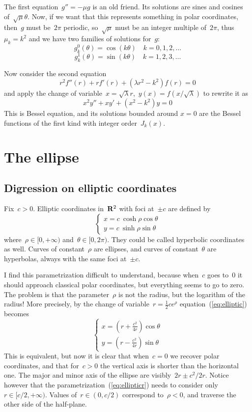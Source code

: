 The first equation~$g''=-\mu g$ is an old friend.  Its solutions are
sines and cosines of~$\sqrt{\mu}\theta$.  Now, if we want that this
represents something in polar coordinates, then~$g$ must be~$2\pi$
periodic, so~$\sqrt{\mu}$ must be an integer multiple of~$2\pi$,
thus~$\mu_k=k^2$ and we have two families of solutions
for~$g$:
\[
	g^0_k(\theta) = \cos(k \theta)
	\quad k=0,1,2,\ldots
\]
\[
	g^1_k(\theta) = \sin(k \theta)
	\quad k=1,2,3,\ldots
\]

Now consider the second equation
\[
	r^2f''(r) + rf'(r)
	+\left(\lambda r^2
		-
	k^2
	\right)f(r) = 0
\]
and apply the change of variable~$x=\sqrt\lambda
r$,~$y(x)=f\left(x/\sqrt\lambda\right)$ to rewrite it as
\[
		x^2y''+xy'+\left(x^2-
	k^2\right)y=0
\]
This is Bessel equation, and its solutions bounded around $x=0$ are
the Bessel functions of the first kind with integer order~$J_k(x)$.

\section{The ellipse}


\subsection{Digression on elliptic coordinates}

Fix~$c>0$.  Elliptic coordinates in~$\mathbf{R}^2$ with foci at~$\pm c$ are
defined by
\begin{equation}\label{eq:elliptic}
	\begin{cases}
		x = c\ \cosh\rho\cos\theta \\
		y = c\ \sinh\rho\sin\theta
	\end{cases}
\end{equation}
where~$\rho\in[0,+\infty)$ and~$\theta\in[0,2\pi)$.
They could be called hyperbolic coordinates as well.
Curves of constant~$\rho$ are ellipses, and curves of
constant~$\theta$ are hyperbolas, always with the same foci at~$\pm c$.

I find this parametrization difficult to understand,
because when~$c$ goes to~$0$ it should approach classical polar
coordinates, but everything seems to go to zero.
The problem is that the parameter~$\rho$ is not the radius, but the
logarithm of the radius!  More precisely, by the change of
variable~$r=\frac12ce^\rho$ equation~(\ref{eq:elliptic}) becomes
\begin{equation}\label{eq:ellipticr}
	\begin{cases}
		x = \left(r + \frac{c^2}{4r}\right)\cos\theta \\
		y = \left(r - \frac{c^2}{4r}\right)\sin\theta
	\end{cases}
\end{equation}
This is equivalent, but now it is clear that when~$c=0$ we recover
polar coordinates, and that for~$c>0$ the vertical axis is shorter
than the horizontal one.  The major and minor axis of the ellipse are
visibly~$2r\pm c^2/2r$.
Notice however that the
parametrization~(\ref{eq:ellipticr}) needs to consider
only~$r\in[c/2,+\infty)$.  Values of~$r\in(0,c/2)$ correspond
to~$\rho<0$, and traverse the other side of the half-plane.


